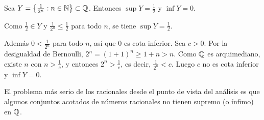 \begin{eg}
  Sea \(Y = \left\{ \frac{1}{2^n} : n \in \mathbb{N} \right\} \subset \mathbb{Q}\). Entonces \(\sup Y = \frac{1}{2}\) y \(\inf Y = 0\).

  Como \(\frac{1}{2} \in Y\) y \(\frac{1}{2^n} \leq \frac{1}{2}\) para todo \(n\), se tiene \(\sup Y = \frac{1}{2}\).

  Además \(0 < \frac{1}{2^n}\) para todo \(n\), así que \(0\) es cota inferior. Sea \(c > 0\). Por la desigualdad de Bernoulli, \(2^n = {(1 + 1)}^n \geq 1 + n > n\). Como \(\mathbb{Q}\) es arquimediano, existe \(n\) con \(n > \frac{1}{c}\), y entonces \(2^n > \frac{1}{c}\), es decir, \(\frac{1}{2^n} < c\). Luego \(c\) no es cota inferior y \(\inf Y = 0\).
\end{eg}

El problema más serio de los racionales desde el punto de vista del análisis es que algunos conjuntos acotados de números racionales no tienen supremo (o ínfimo) en \(\mathbb{Q}\).

